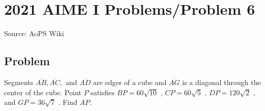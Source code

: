 \documentclass[12pt]{article}
\begin{document}
\section*{{2021 AIME I Problems/Problem 6}}
Source: AoPS Wiki

\subsection*{Problem}
Segments $\overline{AB}, \overline{AC},$ and $\overline{AD}$ are edges of a cube and $\overline{AG}$ is a diagonal through the center of the cube. Point $P$ satisfies $BP=60\sqrt{10}$ , $CP=60\sqrt{5}$ , $DP=120\sqrt{2}$ , and $GP=36\sqrt{7}$ . Find $AP.$
\end{document}
